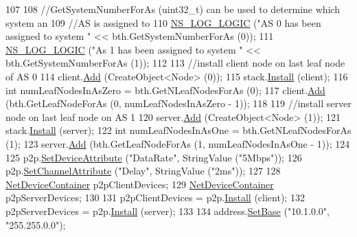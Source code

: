 \begin{DoxyCode}
107 
108   \textcolor{comment}{//GetSystemNumberForAs (uint32\_t) can be used to determine which system an}
109   \textcolor{comment}{//AS is assigned to}
110   \hyperlink{group__logging_ga88acd260151caf2db9c0fc84997f45ce}{NS\_LOG\_LOGIC} (\textcolor{stringliteral}{"AS 0 has been assigned to system "} << bth.GetSystemNumberForAs (0));
111   \hyperlink{group__logging_ga88acd260151caf2db9c0fc84997f45ce}{NS\_LOG\_LOGIC} (\textcolor{stringliteral}{"As 1 has been assigned to system "} << bth.GetSystemNumberForAs (1));
112 
113   \textcolor{comment}{//install client node on last leaf node of AS 0}
114   client.\hyperlink{classns3_1_1NodeContainer_aa60b3a0e70f2fb324e16ffcf8bf31fcb}{Add} (CreateObject<Node> (0));
115   stack.\hyperlink{classns3_1_1InternetStackHelper_a6645b412f31283d2d9bc3d8a95cebbc0}{Install} (client);
116   \textcolor{keywordtype}{int} numLeafNodesInAsZero = bth.GetNLeafNodesForAs (0);
117   client.\hyperlink{classns3_1_1NodeContainer_aa60b3a0e70f2fb324e16ffcf8bf31fcb}{Add} (bth.GetLeafNodeForAs (0, numLeafNodesInAsZero - 1));
118 
119   \textcolor{comment}{//install server node on last leaf node on AS 1}
120   server.\hyperlink{classns3_1_1NodeContainer_aa60b3a0e70f2fb324e16ffcf8bf31fcb}{Add} (CreateObject<Node> (1));
121   stack.\hyperlink{classns3_1_1InternetStackHelper_a6645b412f31283d2d9bc3d8a95cebbc0}{Install} (server);
122   \textcolor{keywordtype}{int} numLeafNodesInAsOne = bth.GetNLeafNodesForAs (1);
123   server.\hyperlink{classns3_1_1NodeContainer_aa60b3a0e70f2fb324e16ffcf8bf31fcb}{Add} (bth.GetLeafNodeForAs (1, numLeafNodesInAsOne - 1));
124 
125   p2p.\hyperlink{classns3_1_1PointToPointHelper_a4577f5ab8c387e5528af2e0fbab1152e}{SetDeviceAttribute} (\textcolor{stringliteral}{"DataRate"}, StringValue (\textcolor{stringliteral}{"5Mbps"}));
126   p2p.\hyperlink{classns3_1_1PointToPointHelper_a6b5317fd17fb61e5a53f8d66a90b63b9}{SetChannelAttribute} (\textcolor{stringliteral}{"Delay"}, StringValue (\textcolor{stringliteral}{"2ms"}));
127 
128   \hyperlink{classns3_1_1NetDeviceContainer}{NetDeviceContainer} p2pClientDevices;
129   \hyperlink{classns3_1_1NetDeviceContainer}{NetDeviceContainer} p2pServerDevices;
130 
131   p2pClientDevices = p2p.\hyperlink{classns3_1_1PointToPointHelper_ab9162fea3e88722666fed1106df1f9ec}{Install} (client);
132   p2pServerDevices = p2p.\hyperlink{classns3_1_1PointToPointHelper_ab9162fea3e88722666fed1106df1f9ec}{Install} (server);
133 
134   address.\hyperlink{classns3_1_1Ipv4AddressHelper_acf7b16dd25bac67e00f5e25f90a9a035}{SetBase} (\textcolor{stringliteral}{"10.1.0.0"}, \textcolor{stringliteral}{"255.255.0.0"});

\end{DoxyCode}
